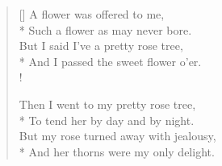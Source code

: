 \documentclass[MAIN]{subfiles}
\begin{document}
\settowidth{\versewidth}{\vin And I passed the sweet flower o'er.}
\begin{verse}[\versewidth]
A flower was offered to me,\\*
\vin Such a flower as may never bore.\\
But I said I've a pretty rose tree,\\*
\vin And I passed the sweet flower o'er.\\!

Then I went to my pretty rose tree,\\*
\vin To tend her by day and by night.\\
But my rose turned away with jealousy,\\*
\vin And her thorns were my only delight.
\end{verse}
\end{document}
